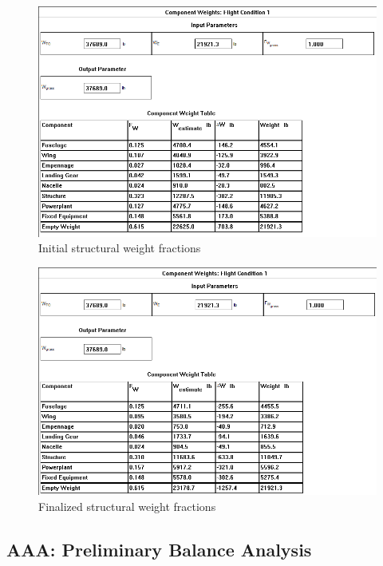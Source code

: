 \documentclass[conf]{new-aiaa}
\begin{document}
\begin{figure}[H]
    \includegraphics[width=\textwidth]{Report3Printouts/Weight/WeightFractionsInitial_cropped.png}
    \caption{Initial structural weight fractions}
    \label{fig:weightfractionsinitial}
\end{figure}

\begin{figure}[H]
    \includegraphics[width=\textwidth]{Report3Printouts/Weight/WeightFractionsFinal_cropped.png}
    \caption{Finalized structural weight fractions}
    \label{fig:weightfractionsfinal}
\end{figure}

\subsection{AAA: Preliminary Balance Analysis}
\end{document}
